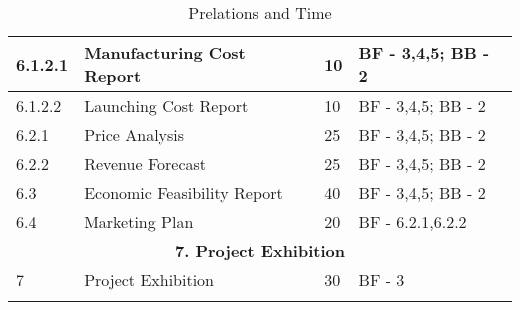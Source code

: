 \begin{longtable}{ | p{1.3cm} | p{7cm} | p{3cm} | p{3.5cm} |}
6.1.2.1 & Manufacturing Cost Report & 10 & BF - 3,4,5; BB - 2 \\ \hline
6.1.2.2 & Launching Cost Report  & 10 & BF - 3,4,5; BB - 2 \\ \hline
6.2.1 & Price Analysis & 25 & BF - 3,4,5; BB - 2 \\ \hline
6.2.2 & Revenue Forecast & 25 & BF - 3,4,5; BB - 2 \\ \hline
6.3 & Economic Feasibility Report & 40 & BF - 3,4,5; BB - 2  \\ \hline
6.4 & Marketing Plan & 20 & BF - 6.2.1,6.2.2 \\ \hline
\multicolumn{4}{|c|}{\textbf{7. Project Exhibition}} \\ \hline
7 & Project Exhibition &30 & BF - 3 \\ \hline
\caption{Prelations and Time} \\
\end{longtable}